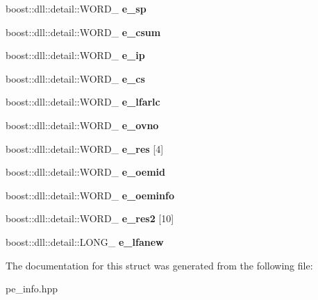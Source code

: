 \begin{DoxyCompactItemize}
\item 
boost\+::dll\+::detail\+::\+W\+O\+R\+D\+\_\+ {\bfseries e\+\_\+sp}\hypertarget{a00145_ab61386ff8426375970baf5ef2f8cf539}{}\label{a00145_ab61386ff8426375970baf5ef2f8cf539}

\item 
boost\+::dll\+::detail\+::\+W\+O\+R\+D\+\_\+ {\bfseries e\+\_\+csum}\hypertarget{a00145_ad16743e4f83acec334693c2547afb105}{}\label{a00145_ad16743e4f83acec334693c2547afb105}

\item 
boost\+::dll\+::detail\+::\+W\+O\+R\+D\+\_\+ {\bfseries e\+\_\+ip}\hypertarget{a00145_a8028ae070559f87ec740a03279131eea}{}\label{a00145_a8028ae070559f87ec740a03279131eea}

\item 
boost\+::dll\+::detail\+::\+W\+O\+R\+D\+\_\+ {\bfseries e\+\_\+cs}\hypertarget{a00145_a919b4a64651b09fedf5e797df7c6f220}{}\label{a00145_a919b4a64651b09fedf5e797df7c6f220}

\item 
boost\+::dll\+::detail\+::\+W\+O\+R\+D\+\_\+ {\bfseries e\+\_\+lfarlc}\hypertarget{a00145_a9b6f598c4f22bba305e99addb64c2f43}{}\label{a00145_a9b6f598c4f22bba305e99addb64c2f43}

\item 
boost\+::dll\+::detail\+::\+W\+O\+R\+D\+\_\+ {\bfseries e\+\_\+ovno}\hypertarget{a00145_a9aa2f2cf607b90105a03dda7df67f266}{}\label{a00145_a9aa2f2cf607b90105a03dda7df67f266}

\item 
boost\+::dll\+::detail\+::\+W\+O\+R\+D\+\_\+ {\bfseries e\+\_\+res} \mbox{[}4\mbox{]}\hypertarget{a00145_af02a10b7d9dfc56843ebaad25d2e6f2f}{}\label{a00145_af02a10b7d9dfc56843ebaad25d2e6f2f}

\item 
boost\+::dll\+::detail\+::\+W\+O\+R\+D\+\_\+ {\bfseries e\+\_\+oemid}\hypertarget{a00145_a5ec6795227f0983da4b2002074731ac6}{}\label{a00145_a5ec6795227f0983da4b2002074731ac6}

\item 
boost\+::dll\+::detail\+::\+W\+O\+R\+D\+\_\+ {\bfseries e\+\_\+oeminfo}\hypertarget{a00145_ae0c3c8fa83ec56e89847021b5221971e}{}\label{a00145_ae0c3c8fa83ec56e89847021b5221971e}

\item 
boost\+::dll\+::detail\+::\+W\+O\+R\+D\+\_\+ {\bfseries e\+\_\+res2} \mbox{[}10\mbox{]}\hypertarget{a00145_a871a5f507eb49fe4977e8759ccc45763}{}\label{a00145_a871a5f507eb49fe4977e8759ccc45763}

\item 
boost\+::dll\+::detail\+::\+L\+O\+N\+G\+\_\+ {\bfseries e\+\_\+lfanew}\hypertarget{a00145_a3612d334575e4d09f3f4a11a9ff52e82}{}\label{a00145_a3612d334575e4d09f3f4a11a9ff52e82}

\end{DoxyCompactItemize}


The documentation for this struct was generated from the following file\+:\begin{DoxyCompactItemize}
\item 
pe\+\_\+info.\+hpp\end{DoxyCompactItemize}
